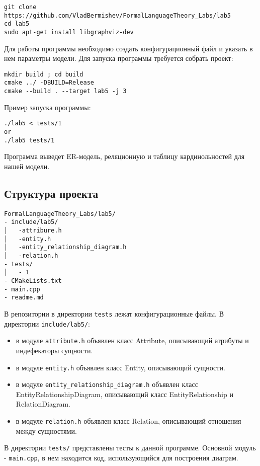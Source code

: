 \documentclass{article}
\begin{document}
\begin{lstlisting}
git clone https://github.com/VladBermishev/FormalLanguageTheory_Labs/lab5
cd lab5
sudo apt-get install libgraphviz-dev
\end{lstlisting}

\qquad Для работы программы необходимо создать конфигурационный файл и указать в нем параметры модели. Для запуска программы требуется собрать проект:

\begin{lstlisting}
mkdir build ; cd build
cmake ../ -DBUILD=Release
cmake --build . --target lab5 -j 3
\end{lstlisting}

\qquad Пример запуска программы:
\begin{lstlisting}
./lab5 < tests/1
or
./lab5 tests/1
\end{lstlisting}

\qquad Программа выведет ER-модель, реляционную и таблицу кардинольностей для нашей модели.

\subsection{Структура проекта}

\begin{lstlisting}
FormalLanguageTheory_Labs/lab5/
- include/lab5/
│   -attribure.h
│   -entity.h
│   -entity_relationship_diagram.h
│   -relation.h
- tests/
│   - 1
- CMakeLists.txt
- main.cpp
- readme.md
\end{lstlisting}

\qquad В репозитории в директории \verb|tests| лежат конфигурационные файлы. В директории \verb|include/lab5/|:
\begin{itemize}
\item в модуле \verb|attribute.h| объявлен класс Attribute, описывающий атрибуты и индефекаторы сущности.
\item в модуле \verb|entity.h| объявлен класс Entity, описывающий сущности.
\item в модуле \verb|entity_relationship_diagram.h| объявлен класс EntityRelationshipDiagram, описывающий класс EntityRelationship и RelationDiagram.
\item в модуле \verb|relation.h| объявлен класс Relation, описывающий отношения между сущностями.

\end{itemize}
\qquad В директории \verb|tests/| представлены тесты к данной программе. Основной модуль - \verb|main.cpp|, в нем находится код, использующийся для построения диаграм.
\end{document}
